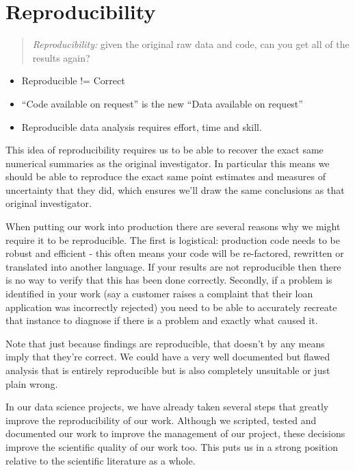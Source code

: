 \documentclass[
  12pt,
]{book}
\begin{document}
\hypertarget{reproducibility-1}{%
\section{Reproducibility}\label{reproducibility-1}}

\begin{quote}
\emph{Reproducibility:} given the original raw data and code, can you get all of the results again?
\end{quote}

\begin{itemize}
\item
  Reproducible != Correct
\item
  ``Code available on request'' is the new ``Data available on request''
\item
  Reproducible data analysis requires effort, time and skill.
\end{itemize}

This idea of reproducibility requires us to be able to recover the exact same numerical summaries as the original investigator. In particular this means we should be able to reproduce the exact same point estimates and measures of uncertainty that they did, which ensures we'll draw the same conclusions as that original investigator.

When putting our work into production there are several reasons why we might require it to be reproducible. The first is logistical: production code needs to be robust and efficient - this often means your code will be re-factored, rewritten or translated into another language. If your results are not reproducible then there is no way to verify that this has been done correctly. Secondly, if a problem is identified in your work (say a customer raises a complaint that their loan application was incorrectly rejected) you need to be able to accurately recreate that instance to diagnose if there is a problem and exactly what caused it.

Note that just because findings are reproducible, that doesn't by any means imply that they're correct. We could have a very well documented but flawed analysis that is entirely reproducible but is also completely unsuitable or just plain wrong.

In our data science projects, we have already taken several steps that greatly improve the reproducibility of our work. Although we scripted, tested and documented our work to improve the management of our project, these decisions improve the scientific quality of our work too. This puts us in a strong position relative to the scientific literature as a whole.
\end{document}
